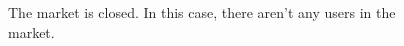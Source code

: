 \begin{figure}[H]
  \label{marketClosed}
  \centering
    \caption{The market is closed. In this case, there aren't any users in the market.}
\end{figure}

